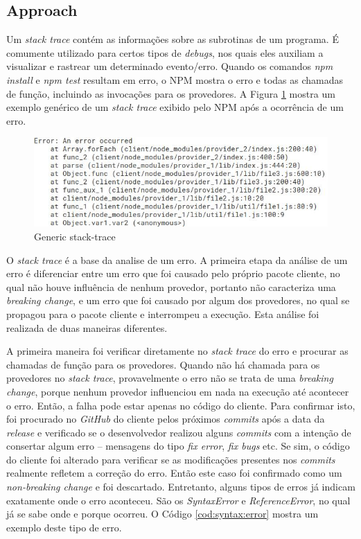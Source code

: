 \subsection{Approach}
\label{apr:rq1}
Um \textit{stack trace} contém as informações sobre as subrotinas de um programa. É comumente utilizado para certos tipos de \textit{debugs}, nos quais eles auxiliam a visualizar e rastrear um determinado evento/erro. Quando os comandos \textit{npm install} e \textit{npm test} resultam em erro, o \Gls{NPM} mostra o erro e todas as chamadas de função, incluindo as invocações para os provedores. A Figura \ref{fig:trace} mostra um exemplo genérico de um \textit{stack trace} exibido pelo \Gls{NPM} após a ocorrência de um erro.

\begin{figure}
    \centering
    \includegraphics[scale=0.7]{figuras/stack_trace.jpeg}
    \caption{Generic stack-trace}
    \label{fig:trace}
\end{figure}{}

O \textit{stack trace} é a base da analise de um erro. A primeira etapa da análise de um erro é diferenciar entre um erro que foi causado pelo próprio pacote cliente, no qual não houve influência de nenhum provedor, portanto não caracteriza uma \textit{breaking change}, e um erro que foi causado por algum dos provedores, no qual se propagou para o pacote cliente e interrompeu a execução. Esta análise foi realizada de duas maneiras diferentes.

A primeira maneira foi verificar diretamente no \textit{stack trace} do erro e procurar as chamadas de função para os provedores. Quando não há chamada para os provedores no \textit{stack trace}, provavelmente o erro não se trata de uma \textit{breaking change}, porque nenhum provedor influenciou em nada na execução até acontecer o erro. Então, a falha pode estar apenas no código do cliente. Para confirmar isto, foi procurado no \textit{GitHub} do cliente pelos próximos \textit{commits} após a data da \textit{release} e verificado se o desenvolvedor realizou alguns \textit{commits} com a intenção de consertar algum erro -- mensagens do tipo \textit{fix error}, \textit{fix bugs} etc. Se sim, o código do cliente foi alterado para verificar se as modificações presentes nos \textit{commits} realmente refletem a correção do erro. Então este caso foi confirmado como um \textit{non-breaking change} e foi descartado. Entretanto, alguns tipos de erros já indicam exatamente onde o erro aconteceu. São os \textit{SyntaxError} e \textit{ReferenceError}, no qual já se sabe onde e porque ocorreu. O Código \ref{cod:syntax:error} mostra um exemplo deste tipo de erro.

